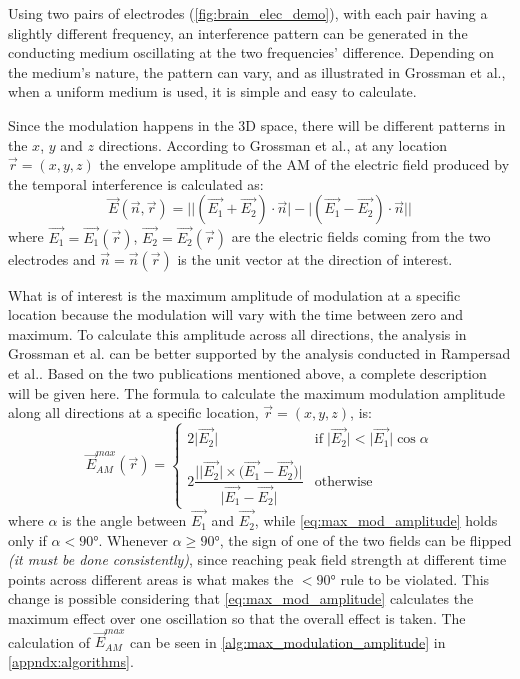 Using two pairs of electrodes (\autoref{fig:brain_elec_demo}), with each pair having a slightly different frequency, an interference pattern can be generated in the conducting medium oscillating at the two frequencies' difference. Depending on the medium's nature, the pattern can vary, and as illustrated in Grossman et al.\cite{Grossman2017}, when a uniform medium is used, it is simple and easy to calculate.

Since the modulation happens in the 3D space, there will be different patterns in the $x$, $y$ and $z$ directions. According to Grossman et al.\cite[page 20]{Grossman2017}, at any location $\vec{r} = (x,y,z)$ the envelope amplitude of the \gls{AM} of the electric field produced by the temporal interference is calculated as:
\begin{equation}
    \label{eq:directional_amplitude}
    \vec{E}(\vec{n},\vec{r}) = \Big|\big|(\vec{E_1} + \vec{E_2})\cdot\vec{n}\big| - \big|(\vec{E_1} - \vec{E_2})\cdot\vec{n}\big|\Big|
\end{equation}
where $\vec{E_1} = \vec{E_1}(\vec{r})$, $\vec{E_2} = \vec{E_2}(\vec{r})$ are the electric fields coming from the two electrodes and $\vec{n} = \vec{n}(\vec{r})$ is the unit vector at the direction of interest.
\\\vspace{1pt}

What is of interest is the maximum amplitude of modulation at a specific location because the modulation will vary with the time between zero and maximum. To calculate this amplitude across all directions, the analysis in Grossman et al.\cite[page 20]{Grossman2017} can be better supported by the analysis conducted in Rampersad et al.\cite[section 2.5]{Rampersad2019}. Based on the two publications mentioned above, a complete description will be given here. The formula to calculate the maximum modulation amplitude along all directions at a specific location, $\vec{r} = (x,y,z)$, is:
\begin{equation}
    \label{eq:max_mod_amplitude}
    \vec{E}_{AM}^{max}(\vec{r}) = \begin{cases}
        2\big|\vec{E_2}\big| & \text{if}\; \big|\vec{E_2}\big| < \big|\vec{E_1}\big|\cos\alpha \\
        &\\
      2\dfrac{\Big|\big|\vec{E_2}\big|\times\big(\vec{E_1} - \vec{E_2}\big)\Big|}{\big|\vec{E_1} - \vec{E_2}\big|} & \text{otherwise}
    \end{cases}
\end{equation}
where $\alpha$ is the angle between $\vec{E_1}$ and $\vec{E_2}$, while \autoref{eq:max_mod_amplitude} holds only if $\alpha < 90\si{\degree}$. Whenever $\alpha \geq 90\si{\degree}$, the sign of one of the two fields can be flipped \textit{(it must be done consistently)}, since reaching peak field strength at different time points across different areas is what makes the $< 90\si{\degree}$ rule to be violated. This change is possible considering that \autoref{eq:max_mod_amplitude} calculates the maximum effect over one oscillation so that the overall effect is taken. The calculation of $\vec{E}_{AM}^{max}$ can be seen in \autoref{alg:max_modulation_amplitude} in \autoref{appndx:algorithms}.
